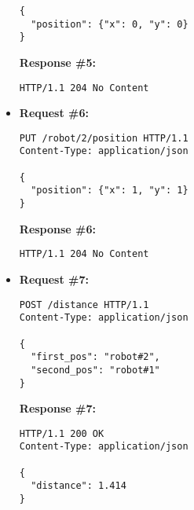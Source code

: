 \begin{itemize}
\begin{lstlisting}[xleftmargin=1pc,numbers=none]
{
  "position": {"x": 0, "y": 0}
}
\end{lstlisting}
\textbf{Response \#5:}
\begin{lstlisting}[xleftmargin=1pc,numbers=none]
HTTP/1.1 204 No Content
\end{lstlisting}

\item  %
\textbf{Request \#6:}
\begin{lstlisting}[xleftmargin=1pc,numbers=none]
PUT /robot/2/position HTTP/1.1
Content-Type: application/json

{
  "position": {"x": 1, "y": 1}
}
\end{lstlisting}
\textbf{Response \#6:}
\begin{lstlisting}[xleftmargin=1pc,numbers=none]
HTTP/1.1 204 No Content
\end{lstlisting}

\item  %
\textbf{Request \#7:}
\begin{lstlisting}[xleftmargin=1pc,numbers=none]
POST /distance HTTP/1.1
Content-Type: application/json

{
  "first_pos": "robot#2",
  "second_pos": "robot#1"
}
\end{lstlisting}
\textbf{Response \#7:}
\begin{lstlisting}[xleftmargin=1pc,numbers=none]
HTTP/1.1 200 OK
Content-Type: application/json

{
  "distance": 1.414
}
\end{lstlisting}

\end{itemize}
